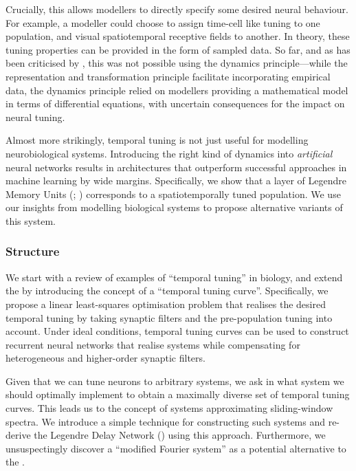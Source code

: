 Crucially, this allows modellers to directly specify some desired neural behaviour.
For example, a modeller could choose to assign time-cell like tuning \citep{pastalkova2008internally,tiganj2016sequential} to one population, and visual spatiotemporal receptive fields \citep{carandini1999linearity} to another.
In theory, these tuning properties can be provided in the form of sampled data.
So far, and as has been criticised by \citep{nicola2017supervised}, this was not possible using the \NEF dynamics principle---while the representation and transformation principle facilitate incorporating empirical data, the dynamics principle relied on modellers providing a mathematical model in terms of differential equations, with uncertain consequences for the impact on neural tuning.

Almost more strikingly, temporal tuning is not just useful for modelling neurobiological systems.
Introducing the right kind of dynamics into \emph{artificial} neural networks results in architectures that outperform successful approaches in machine learning by wide margins.
Specifically, we show that a layer of Legendre Memory Units (\LMUpl; \cite{voelker2019lmu}) corresponds to a spatiotemporally tuned \NEF population. We use our insights from modelling biological systems to propose alternative variants of this system.

\subsubsection{Structure}
We start  with a review of examples of \enquote{temporal tuning} in biology, and extend the \NEF by introducing the concept of a \enquote{temporal tuning curve}.
Specifically, we propose a linear least-squares optimisation problem that realises the desired temporal tuning by taking synaptic filters and the pre-population tuning into account.
Under ideal conditions, temporal tuning curves can be used to construct recurrent neural networks that realise \LTI systems while compensating for heterogeneous and higher-order synaptic filters.

Given that we can tune neurons to arbitrary \LTI systems, we ask in  what \LTI system we should optimally implement to obtain a maximally diverse set of temporal tuning curves.
This leads us to the concept of \LTI systems approximating sliding-window spectra.
We introduce a simple technique for constructing such \LTI systems and re-derive the Legendre Delay Network (\LDN) using this approach.
Furthermore, we unsuspectingly discover a \enquote{modified Fourier system} as a potential alternative to the \LDN.

